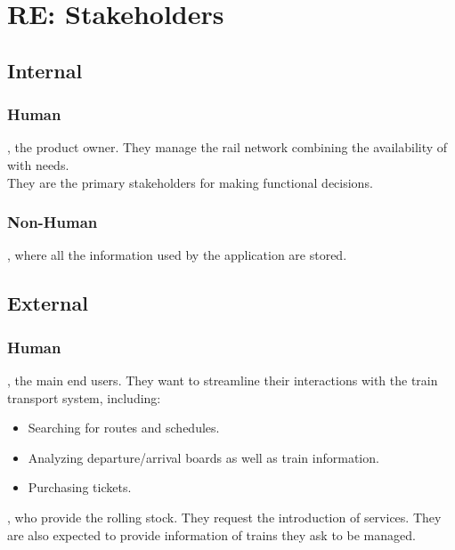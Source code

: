 \section*{RE: Stakeholders}

\subsection*{Internal}

\subsubsection*{Human}
, the product owner. They manage the rail network combining the availability of  with  needs.\\
They are the primary stakeholders for making functional decisions.

\subsubsection*{Non-Human}
, where all the information used by the application are stored.

\subsection*{External}

\subsubsection*{Human}
, the main end users. They want to streamline their interactions with the train transport system, including:
\begin{itemize}
	\item Searching for routes and schedules.
	\item Analyzing departure/arrival boards as well as train information.
	\item Purchasing tickets.
\end{itemize}

\noindent{}, who provide the rolling stock. They request the introduction of services. They are also expected to provide information of trains they ask to be managed.

